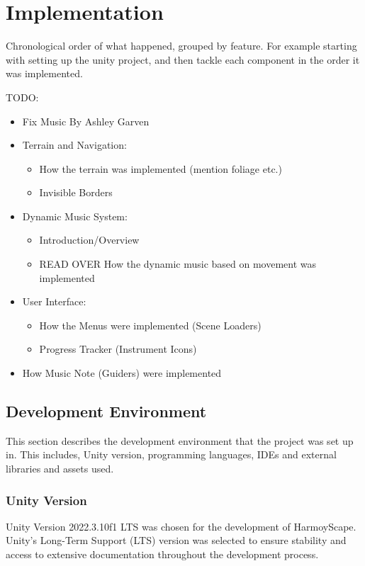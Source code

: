 \documentclass{l4proj}
\begin{document}
\chapter{Implementation}

Chronological order of what happened, grouped by feature. For example starting with setting up the unity project, and then tackle each component in the order it was implemented.

TODO:
\begin{itemize}
    \item Fix Music By Ashley Garven
    \item Terrain and Navigation:
    \begin{itemize}
        \item How the terrain was implemented (mention foliage etc.)
        \item Invisible Borders
    \end{itemize}
    \item Dynamic Music System:
    \begin{itemize}
        \item Introduction/Overview
        \item READ OVER How the dynamic music based on movement was implemented
    \end{itemize}
    \item User Interface:
    \begin{itemize}
        \item How the Menus were implemented (Scene Loaders)
        \item Progress Tracker (Instrument Icons)
    \end{itemize}
    \item How Music Note (Guiders) were implemented
\end{itemize}

\newpage

\section{Development Environment}
This section describes the development environment that the project was set up in. This includes, Unity version, programming languages, IDEs and external libraries and assets used.

\subsection{Unity Version}
Unity Version 2022.3.10f1 LTS was chosen for the development of HarmoyScape. Unity's Long-Term Support (LTS) version was selected to ensure stability and access to extensive documentation throughout the development process.
\end{document}
